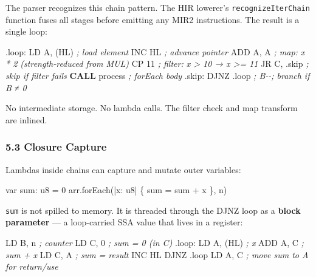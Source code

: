 \documentclass[
  11pt,
]{article}
\newenvironment{Shaded}{}{}
\newcommand{\BuiltInTok}[1]{\textcolor[rgb]{0.00,0.50,0.00}{#1}}
\newcommand{\CommentTok}[1]{\textcolor[rgb]{0.38,0.63,0.69}{\textit{#1}}}
\newcommand{\ControlFlowTok}[1]{\textcolor[rgb]{0.00,0.44,0.13}{\textbf{#1}}}
\newcommand{\DecValTok}[1]{\textcolor[rgb]{0.25,0.63,0.44}{#1}}
\newcommand{\FunctionTok}[1]{\textcolor[rgb]{0.02,0.16,0.49}{#1}}
\newcommand{\NormalTok}[1]{#1}
\newcommand{\OperatorTok}[1]{\textcolor[rgb]{0.40,0.40,0.40}{#1}}
\begin{document}
The parser recognizes this chain pattern. The HIR lowerer's
\texttt{recognizeIterChain} function fuses all stages before emitting
any MIR2 instructions. The result is a single loop:

\begin{Shaded}
\begin{Highlighting}[]
\FunctionTok{.loop:}
\NormalTok{    LD A}\OperatorTok{,} \OperatorTok{(}\NormalTok{HL}\OperatorTok{)}       \CommentTok{; load element}
    \BuiltInTok{INC}\NormalTok{ HL           }\CommentTok{; advance pointer}
    \BuiltInTok{ADD}\NormalTok{ A}\OperatorTok{,}\NormalTok{ A         }\CommentTok{; map: x * 2  (strength{-}reduced from MUL)}
\NormalTok{    CP }\DecValTok{11}            \CommentTok{; filter: x \textgreater{} 10 → x \textgreater{}= 11}
\NormalTok{    JR C}\OperatorTok{,} \OperatorTok{.}\NormalTok{skip      }\CommentTok{; skip if filter fails}
    \ControlFlowTok{CALL}\NormalTok{ process     }\CommentTok{; forEach body}
\FunctionTok{.skip:}
\NormalTok{    DJNZ }\OperatorTok{.}\NormalTok{loop       }\CommentTok{; B{-}{-}; branch if B ≠ 0}
\end{Highlighting}
\end{Shaded}

No intermediate storage. No lambda calls. The filter check and map
transform are inlined.

\subsubsection{5.3 Closure Capture}\label{closure-capture}

Lambdas inside chains can capture and mutate outer variables:

\begin{Shaded}
\begin{Highlighting}[]
\NormalTok{var sum: u8 = 0}
\NormalTok{arr.forEach(|x: u8| \{ sum = sum + x \}, n)}
\end{Highlighting}
\end{Shaded}

\texttt{sum} is not spilled to memory. It is threaded through the DJNZ
loop as a \textbf{block parameter} --- a loop-carried SSA value that
lives in a register:

\begin{Shaded}
\begin{Highlighting}[]
\NormalTok{    LD B}\OperatorTok{,}\NormalTok{ n          }\CommentTok{; counter}
\NormalTok{    LD C}\OperatorTok{,} \DecValTok{0}          \CommentTok{; sum = 0 (in C)}
\FunctionTok{.loop:}
\NormalTok{    LD A}\OperatorTok{,} \OperatorTok{(}\NormalTok{HL}\OperatorTok{)}       \CommentTok{; x}
    \BuiltInTok{ADD}\NormalTok{ A}\OperatorTok{,}\NormalTok{ C         }\CommentTok{; sum + x}
\NormalTok{    LD C}\OperatorTok{,}\NormalTok{ A          }\CommentTok{; sum = result}
    \BuiltInTok{INC}\NormalTok{ HL}
\NormalTok{    DJNZ }\OperatorTok{.}\NormalTok{loop}
\NormalTok{    LD A}\OperatorTok{,}\NormalTok{ C          }\CommentTok{; move sum to A for return/use}
\end{Highlighting}
\end{Shaded}
\end{document}
